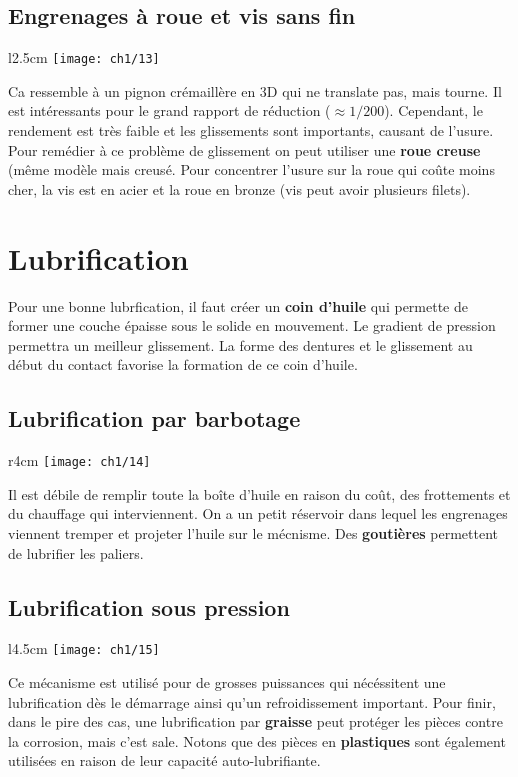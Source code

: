 \subsection{Engrenages à roue et vis sans fin}
\begin{wrapfigure}[6]{l}{2.5cm}
	\vspace{-5mm}
	\texttt{[image: ch1/13]}
\end{wrapfigure}	
\noindent Ca ressemble à un pignon crémaillère en 3D qui ne translate pas, mais tourne. Il est intéressants pour le grand rapport de réduction ($\approx 1/200$). Cependant, le rendement est très faible et les glissements sont importants, causant de l'usure. Pour remédier à ce problème de glissement on peut utiliser une \textbf{roue creuse} (même modèle mais creusé. Pour concentrer l'usure sur la roue qui coûte moins cher, la vis est en acier et la roue en bronze (vis peut avoir plusieurs filets). \\
	
\section{Lubrification}
\noindent Pour une bonne lubrfication, il faut créer un \textbf{coin d'huile} qui permette de former une couche épaisse sous le solide en mouvement. Le gradient de pression permettra un meilleur glissement. La forme des dentures et le glissement au début du contact favorise la formation de ce coin d'huile. 

\subsection{Lubrification par barbotage}
\begin{wrapfigure}[5]{r}{4cm}
	\vspace{-5mm}
	\texttt{[image: ch1/14]}
\end{wrapfigure}	
\noindent Il est débile de remplir toute la boîte d'huile en raison du coût, des frottements et du chauffage qui interviennent. On a un petit réservoir dans lequel les engrenages viennent tremper et projeter l'huile sur le mécnisme. Des \textbf{goutières} permettent de lubrifier les paliers. 
	
\subsection{Lubrification sous pression}
\begin{wrapfigure}[6]{l}{4.5cm}
	\vspace{-5mm}
	\texttt{[image: ch1/15]}
\end{wrapfigure}	
\noindent Ce mécanisme est utilisé pour de grosses puissances qui nécéssitent une lubrification dès le démarrage ainsi qu'un refroidissement important. Pour finir, dans le pire des cas, une lubrification par \textbf{graisse} peut protéger les pièces contre la corrosion, mais c'est sale. Notons que des pièces en \textbf{plastiques} sont également utilisées en raison de leur capacité auto-lubrifiante.
	
